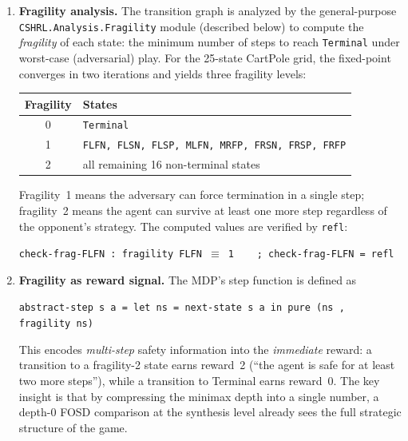 \documentclass[9pt,a4paper]{article}
\theoremstyle{plain}
\theoremstyle{definition}
\theoremstyle{remark}
\begin{document}
\begin{enumerate}
\item \textbf{Fragility analysis.}  The transition graph is analyzed by the general-purpose \texttt{CSHRL.Analysis.Fragility} module (described below) to compute the \emph{fragility} of each state: the minimum number of steps to reach \texttt{Terminal} under worst-case (adversarial) play.  For the 25-state CartPole grid, the fixed-point converges in two iterations and yields three fragility levels:
\begin{center}
\begin{tabular}{cl}
\textbf{Fragility} & \textbf{States} \\
\hline
0 & \texttt{Terminal} \\
1 & \texttt{FLFN, FLSN, FLSP, MLFN, MRFP, FRSN, FRSP, FRFP} \\
2 & all remaining 16 non-terminal states
\end{tabular}
\end{center}
Fragility~1 means the adversary can force termination in a single step; fragility~2 means the agent can survive at least one more step regardless of the opponent's strategy.  The computed values are verified by \texttt{refl}:
\begin{center}
\texttt{check-frag-FLFN~:~fragility~FLFN~$\equiv$~1~~~~;~check-frag-FLFN~=~refl}
\end{center}

\item \textbf{Fragility as reward signal.}  The MDP's step function is defined as
\begin{center}
\texttt{abstract-step~s~a~=~let~ns~=~next-state~s~a~in~pure~(ns\,,\,fragility~ns)}
\end{center}
This encodes \emph{multi-step} safety information into the \emph{immediate} reward: a transition to a fragility-2 state earns reward~2 (``the agent is safe for at least two more steps''), while a transition to Terminal earns reward~0.  The key insight is that by compressing the minimax depth into a single number, a depth-0 FOSD comparison at the synthesis level already sees the full strategic structure of the game.


\end{enumerate}
\end{document}
